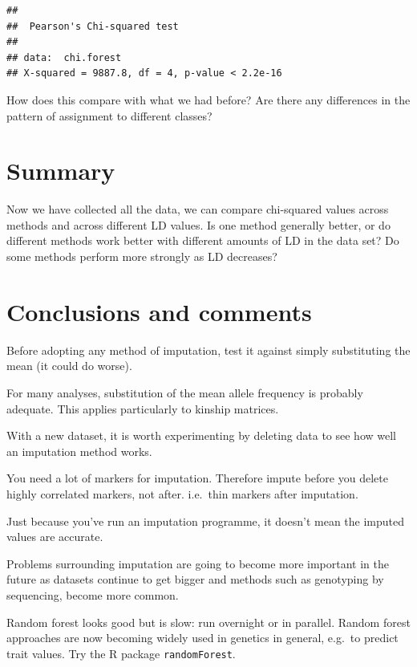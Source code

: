 \documentclass[
]{book}
\makeatletter
\newenvironment{kframe}{%
\medskip{}
\setlength{\fboxsep}{.8em}
 \def\at@end@of@kframe{}%
 \ifinner\ifhmode%
  \def\at@end@of@kframe{\end{minipage}}%
  \begin{minipage}{\columnwidth}%
 \fi\fi%
 \def\FrameCommand##1{\hskip\@totalleftmargin \hskip-\fboxsep
 \colorbox{shadecolor}{##1}\hskip-\fboxsep
     \hskip-\linewidth \hskip-\@totalleftmargin \hskip\columnwidth}%
 \MakeFramed {\advance\hsize-\width
   \@totalleftmargin\z@ \linewidth\hsize
   \@setminipage}}%
 {\par\unskip\endMakeFramed%
 \at@end@of@kframe}
\newenvironment{rmdblock}[1]
  {
  \begin{itemize}
  \renewcommand{\labelitemi}{
    \raisebox{-.7\height}[0pt][0pt]{
      {\setkeys{Gin}{width=3em,keepaspectratio}\texttt{[image: images/\#1]}}
    }
  }
  \setlength{\fboxsep}{1em}
  \begin{kframe}
  \item
  }
  {
  \end{kframe}
  \end{itemize}
  }
\newenvironment{rmdquiz}
  {\begin{rmdblock}{quiz}}
  {\end{rmdblock}}
\makeatother
\begin{document}
\begin{verbatim}
## 
##  Pearson's Chi-squared test
## 
## data:  chi.forest
## X-squared = 9887.8, df = 4, p-value < 2.2e-16
\end{verbatim}

How does this compare with what we had before? Are there any differences in the pattern of assignment to different classes?

\hypertarget{summary-1}{%
\section{Summary}\label{summary-1}}

\begin{rmdquiz}
Now we have collected all the data, we can compare chi-squared values across methods and across different LD values. Is one method generally better, or do different methods work better with different amounts of LD in the data set? Do some methods perform more strongly as LD decreases?
\end{rmdquiz}

\hypertarget{conclusions-and-comments}{%
\section{Conclusions and comments}\label{conclusions-and-comments}}

Before adopting any method of imputation, test it against simply substituting the mean (it could do worse).

For many analyses, substitution of the mean allele frequency is probably adequate. This applies particularly to kinship matrices.

With a new dataset, it is worth experimenting by deleting data to see how well an imputation method works.

You need a lot of markers for imputation. Therefore impute before you delete highly correlated markers, not after. i.e.~thin markers after imputation.

Just because you've run an imputation programme, it doesn't mean the imputed values are accurate.

Problems surrounding imputation are going to become more important in the future as datasets continue to get bigger and methods such as genotyping by sequencing, become more common.

Random forest looks good but is slow: run overnight or in parallel. Random forest approaches are now becoming widely used in genetics in general, e.g.~to predict trait values. Try the R package \texttt{randomForest}.
\end{document}
